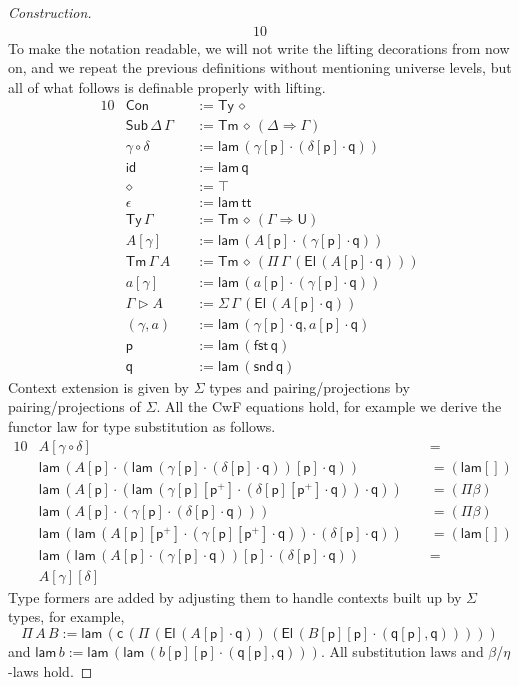 \documentclass[sigplan,10pt,anonymous,review]{acmart}\settopmatter{printfolios=true,printccs=false,printacmref=false}
\newcommand{\Ra}{\Rightarrow}
\newcommand{\Ty}{\mathsf{Ty}}
\newcommand{\Tm}{\mathsf{Tm}}
\newcommand{\Con}{\mathsf{Con}}
\newcommand{\Sub}{\mathsf{Sub}}
\newcommand{\p}{\mathsf{p}}
\newcommand{\q}{\mathsf{q}}
\newcommand{\ext}{\mathop{\triangleright}}
\newcommand{\lam}{\mathsf{lam}}
\newcommand{\U}{\mathsf{U}}
\newcommand{\El}{\mathsf{El}}
\newcommand{\cd}{\mathsf{c}}
\renewcommand{\tt}{\mathsf{tt}}
\newcommand{\fst}{\mathsf{fst}}
\newcommand{\snd}{\mathsf{snd}}
\newcommand{\id}{\mathsf{id}}
\begin{document}
\begin{proof}[Construction]
\begin{alignat*}{10}
  \end{alignat*}
  To make the notation readable, we will not write the lifting
  decorations from now on, and we repeat the previous definitions
  without mentioning universe levels, but all of what follows is
  definable properly with lifting.
  \begin{alignat*}{10}
    & \Con && := \Ty\,\diamond \\
    & \Sub\,\Delta\,\Gamma && := \Tm\,\diamond\,(\Delta\Ra\Gamma) \\
    & \gamma\circ\delta && := \lam\,(\gamma[\p]\cdot(\delta[\p]\cdot\q)) \\
    & \id && := \lam\,\q \\
    & \diamond && := \top \\
    & \epsilon && := \lam\,\tt \\
    & \Ty\,\Gamma && := \Tm\,\diamond\,(\Gamma\Ra\U) \\
    & A[\gamma] && := \lam\,(A[\p]\cdot(\gamma[\p]\cdot\q)) \\
    & \Tm\,\Gamma\,A && := \Tm\,\diamond\,(\Pi\,\Gamma\,(\El\,(A[\p]\cdot\q))) \\
    & a[\gamma] && := \lam\,(a[\p]\cdot(\gamma[\p]\cdot\q)) \\
    & \Gamma\ext A && := \Sigma\,\Gamma\,(\El\,(A[\p]\cdot\q)) \\
    & (\gamma,a) && := \lam\,(\gamma[\p]\cdot\q,a[\p]\cdot\q) \\
    & \p && := \lam\,(\fst\,\q) \\
    & \q && := \lam\,(\snd\,\q)
  \end{alignat*}
  Context extension is given by $\Sigma$ types and pairing/projections
  by pairing/projections of $\Sigma$. All the CwF equations hold, for
  example we derive the functor law for type substitution as follows.
  \begin{alignat*}{10}
    & A[\gamma\circ\delta] && {=} \\
    & \lam\,(A[\p]\cdot(\lam\,(\gamma[\p]\cdot(\delta[\p]\cdot\q))[\p]\cdot\q)) && {=}(\lam[]) \\
    & \lam\,(A[\p]\cdot(\lam\,(\gamma[\p][\p^+]\cdot(\delta[\p][\p^+]\cdot\q))\cdot\q)) && {=}(\Pi\beta) \\
    & \lam\,(A[\p]\cdot(\gamma[\p]\cdot(\delta[\p]\cdot\q))) && {=}(\Pi\beta) \\
    & \lam\,(\lam\,(A[\p][\p^+]\cdot(\gamma[\p][\p^+]\cdot\q))\cdot(\delta[\p]\cdot\q))\,\, && {=}(\lam[]) \\
    & \lam\,(\lam\,(A[\p]\cdot(\gamma[\p]\cdot\q))[\p]\cdot(\delta[\p]\cdot\q)) && {=} \\
    & A[\gamma][\delta]
  \end{alignat*}
  Type formers are added by adjusting them to handle contexts built up
  by $\Sigma$ types, for example,
  \[
  \Pi\,A\,B := \lam\,(\cd\,(\Pi\,(\El\,(A[\p]\cdot\q))\,(\El\,(B[\p][\p]\cdot(\q[\p],\q)))))
  \]
  and $\lam\,b := \lam\,(\lam\,(b[\p][\p]\cdot(\q[\p],\q)))$. All
  substitution laws and $\beta$/$\eta$-laws hold.
\end{proof}
\end{document}
